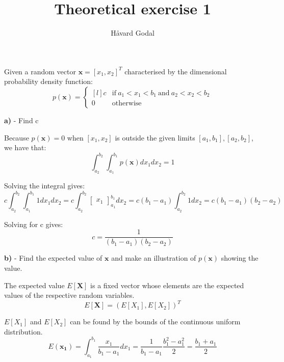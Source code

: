 \documentclass{homeworg}
\title{Theoretical exercise 1}
\author{Håvard Godal}
\begin{document}
\maketitle

\problem
Given a random vector $\bm{x} = [x_1 , x_2 ]^T$ characterised by the dimensional probability density function:
\begin{equation}
    p(\bm{x}) = \left\{
        \begin{matrix*}[l]
            c & \text{if} \ a_1<x_1<b_1 \ \text{and} \ a_2<x_2<b_2 \\ 
            0 & \text{otherwise}
        \end{matrix*}
    \right. 
\end{equation}

\textbf{a)} - Find c
\smallskip

Because $p(\bm{x}) = 0$ when $[x_1, x_2]$ is outside the given limits $[a_1, b_1], [a_2, b_2]$, we have that:
\begin{equation}
    \int_{a_2}^{b_2}\int_{a_1}^{b_1} p(\bm{x})dx_1 dx_2 = 1    
\end{equation}

Solving the integral gives:
\begin{equation}
    c \int_{a_2}^{b_2}\int_{a_1}^{b_1} 1 dx_1 dx_2 = 
    c \int_{a_2}^{b_2}\begin{bmatrix}x_1\end{bmatrix}_{a_1}^{b_1} dx_2 = 
    c(b_1 - a_1)\int_{a_2}^{b_2} 1 dx_2 = 
    c(b_1 - a_1)(b_2 - a_2)
\end{equation}

Solving for c gives:
\begin{equation}
    c = \frac{1}{(b_1 - a_1)(b_2 - a_2)}
\end{equation}

\bigskip
\newpage
\textbf{b)} - Find the expected value of $\bm{x}$ and make an illustration of $p(\bm{x})$ showing the value.
\smallskip

The expected value $E[\bm{X}]$ is a fixed vector whose elements are the expected values of the respective random variables.
\begin{equation}
    E[\bm{X}] = (E[X_1], E[X_2])^T
\end{equation}

$E[X_1]$ and $E[X_2]$ can be found by the bounds of the continuous uniform distribution.
\begin{equation}
    E(\bm{x_1}) = \int_{a_1}^{b_1} \frac{x_1}{b_1-a_1} dx_1 = 
    \frac{1}{b_1-a_1} \frac{b_1^2-a_1^2}{2} =
    \frac{b_1+a_1}{2}
\end{equation}
\end{document}

